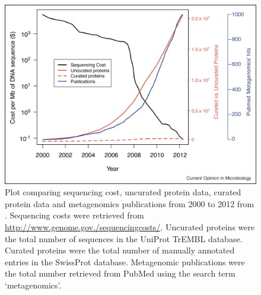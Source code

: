\begin{figure}
\centering
\includegraphics[width=120mm]{conc_figures/seq_vs_curated.jpg}
\caption[Plot of sequencing cost, curated proteins and metagenomic publications from \citet{Temperton2012}]{Plot comparing sequencing cost, uncurated protein data, curated protein data and metagenomics publications from 2000 to 2012 from \citet{Temperton2012}.
Sequencing costs were retrieved from 
\url{http://www.genome.gov./sequencingcosts/}.
Uncurated proteins were the total number of sequences in the UniProt TrEMBL database.
Curated proteins were the total number of manually annotated entries in the SwissProt database.
Metagenomic publications were the total number retrieved from PubMed using the search term `metagenomics'.
}
\label{fig:seq_vs_curated}

\end{figure}
